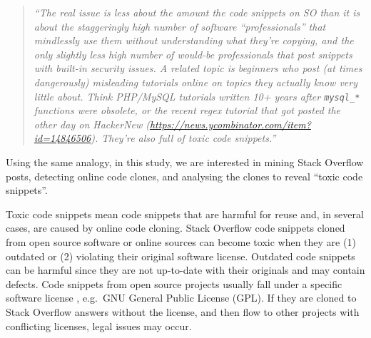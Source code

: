 \documentclass[10pt,journal,compsoc]{IEEEtran}
\begin{document}
\begin{quote}
	\textit{``The real issue is less about the amount the code snippets
	on SO than it is about the staggeringly high number of software
	``professionals'' that mindlessly use them without understanding what they're
	copying, and the only slightly less high number of would-be professionals that
	post snippets with built-in security issues.  A related topic is beginners who
	post (at times dangerously) misleading tutorials online on topics they actually
	know very little about. Think PHP/MySQL tutorials written 10+ years after
	\texttt{mysql\_*} functions were obsolete, or the recent regex tutorial that
	got posted the other day on HackerNew
	(\url{https://news.ycombinator.com/item?id=14846506}). They're also full of
	toxic code snippets.''}
\end{quote}

Using the same analogy, in this study, we are interested in mining Stack
Overflow posts, detecting online code clones, and analysing the clones to reveal
``toxic code snippets''.

Toxic code snippets mean code snippets that are harmful for reuse and, in
several cases, are caused by online code cloning. Stack Overflow code snippets
cloned from open source software or online sources can become toxic when they
are (1) outdated or (2) violating their original software
license. Outdated code snippets
can be harmful since they are not up-to-date with their originals and may
contain defects. Code snippets from open source projects usually fall under a
specific software license , e.g.~GNU General Public License (GPL). If they are
cloned to Stack Overflow answers without the license, and then flow to other projects
with conflicting licenses, legal issues may occur.
\end{document}
